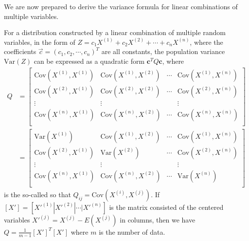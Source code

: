 We are now prepared to derive the variance formula for linear combinations of multiple variables.
\begin{proper}
\label{proper:variancemul}
For a distribution constructed by a linear combination of multiple random variables, in the form of $Z = c_1X^{(1)} + c_2X^{(2)} + \cdots + c_nX^{(n)}$, where the coefficients $\vec{c} = (c_1, c_2, \cdots, c_n)^T$ are all constants, the population variance $\text{Var}(Z)$ can be expressed as a quadratic form $\textbf{c}^TQ\textbf{c}$, where
\begin{subequations}
\begin{align}
Q &=
\begin{bmatrix}
\text{Cov}(X^{(1)}, X^{(1)}) & \text{Cov}(X^{(1)}, X^{(2)}) & \cdots & \text{Cov}(X^{(1)}, X^{(n)}) \\
\text{Cov}(X^{(2)}, X^{(1)}) & \text{Cov}(X^{(2)}, X^{(2)}) & \cdots & \text{Cov}(X^{(2)}, X^{(n)}) \\
\vdots & \vdots &  & \vdots \\
\text{Cov}(X^{(n)}, X^{(1)}) & \text{Cov}(X^{(n)}, X^{(2)}) & \cdots & \text{Cov}(X^{(n)}, X^{(n)}) \\
\end{bmatrix} \\
&=
\begin{bmatrix}
\text{Var}(X^{(1)}) & \text{Cov}(X^{(1)}, X^{(2)}) & \cdots & \text{Cov}(X^{(1)}, X^{(n)}) \\
\text{Cov}(X^{(2)}, X^{(1)}) & \text{Var}(X^{(2)}) & \cdots & \text{Cov}(X^{(2)}, X^{(n)}) \\
\vdots & \vdots &  & \vdots \\
\text{Cov}(X^{(n)}, X^{(1)}) & \text{Cov}(X^{(n)}, X^{(2)}) & \cdots & \text{Var}(X^{(n)}) \\
\end{bmatrix} 
\end{align}    
\end{subequations}
is the so-called  so that $Q_{ij} = \text{Cov}(X^{(i)}, X^{(j)})$. If $[X'] = [X'^{(1)}|X'^{(2)}|\cdots|X'^{(n)}]$ is the matrix consisted of the centered variables $X'^{(j)} = X^{(j)} - E(X^{(j)})$ in columns, then we have $Q = \frac{1}{m-1}[X']^T[X']$ where $m$ is the number of data.
\end{proper}

